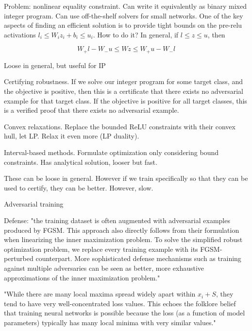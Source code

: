 \documentclass[english]{article}
\begin{document}
Problem: nonlinear equality constraint. Can write it equivalently as binary mixed integer program. Can use off-the-shelf solvers for small networks. One of the key aspects of finding an efficient solution is to provide tight bounds on the pre-relu activations $l_i \le W_iz_i+b_i \le u_i$. How to do it?  In general, if $l\le z\le u$, then 

$$W_+l-W_-u\le Wz \le W_+u-W_-l$$

Loose in general, but useful for IP

\item Certifying robustness. If we solve our integer program for some target class, and the objective is positive, then this is a certificate that there exists no adversarial example for that target class. If the objective is positive for all target classes, this is a verified proof that there exists no adversarial example.

\item Convex relaxations. Replace the bounded ReLU constraints with their convex hull, let LP. Relax it even more (LP duality).

Interval-based methods. Formulate optimization only considering bound constraints. Has analytical solution, looser but fast.

These can be loose in general. However if we train specifically so that they can be used to certify, they can be better. However, slow.

\eenum 

\item Adversarial training
\benum 

\item Defense: "the training dataset is often augmented with adversarial examples produced
by FGSM. This approach also directly follows from their formulation when linearizing the inner maximization
problem. To solve the simplified robust optimization problem, we replace every training example
with its FGSM-perturbed counterpart. More sophisticated defense mechanisms such as training
against multiple adversaries can be seen as better, more exhaustive approximations of the inner
maximization problem."

\item "While there are many local maxima spread widely apart within
$x_i + S$, they tend to have very well-concentrated loss values. This echoes the folklore belief that
training neural networks is possible because the loss (as a function of model parameters) typically
has many local minima with very similar values."
\end{document}
